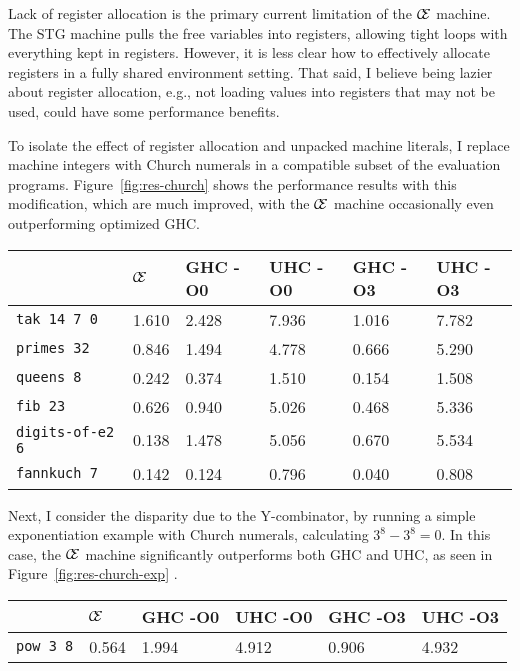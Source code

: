 Lack of register allocation is the primary current limitation of the $\mathcal{\mathcal{C} \mskip -4mu \mathcal{E}}$
machine. The STG machine pulls the free variables into registers, allowing tight
loops with everything kept in registers. However, it is less clear how to
effectively allocate registers in a fully shared environment setting.
That said, I believe being lazier about register allocation, e.g., not loading
values into registers that may not be used, could have some performance benefits.

To isolate the effect of register allocation and unpacked machine
literals, I replace machine integers with Church numerals in a compatible
subset of the evaluation programs. Figure~\ref{fig:res-church}
shows the performance results with this modification, which are much improved,
with the $\mathcal{\mathcal{C} \mskip -4mu \mathcal{E}}$ machine occasionally
even outperforming optimized GHC.

\begin{figure*}
\centering
\begin{tabularx}{\textwidth}{l | X | X | X | X | X}
& $\mathcal{\mathcal{C} \mskip -4mu \mathcal{E}}$ & GHC -O0 & UHC -O0 & GHC -O3 & UHC -O3 \\
\hline
\texttt{tak 14 7 0} & 1.610 & 2.428 & 7.936 & 1.016 & 7.782 \\
\texttt{primes 32} & 0.846 & 1.494 & 4.778 & 0.666 & 5.290 \\
\texttt{queens 8} & 0.242 & 0.374 & 1.510 & 0.154 & 1.508 \\
\texttt{fib 23} & 0.626 & 0.940 & 5.026 & 0.468 & 5.336 \\
\texttt{digits-of-e2 6} & 0.138 & 1.478 & 5.056 & 0.670 & 5.534 \\
\texttt{fannkuch 7} & 0.142 & 0.124 & 0.796 & 0.040 & 0.808 \\
\end{tabularx}
\caption{Church Numeral Benchmark Results. Measurement is wall clock time, 
units are seconds. Times averaged over 5 runs.}
\label{fig:res-church}
\end{figure*}

Next, I consider the disparity due to the Y-combinator, by running a simple
exponentiation example with Church numerals, calculating $3^8 - 3^8 = 0$. In
this case, the $\mathcal{\mathcal{C} \mskip -4mu \mathcal{E}}$ machine
significantly outperforms both GHC and UHC, as seen in
Figure~\ref{fig:res-church-exp} .

\begin{figure*}
\begin{tabularx}{\textwidth}{l | X | X | X | X | X}
& $\mathcal{\mathcal{C} \mskip -4mu \mathcal{E}}$ & GHC -O0 & UHC -O0 & GHC -O3 & UHC -O3 \\
\hline
\texttt{pow 3 8} & 0.564 & 1.994 & 4.912 & 0.906 & 4.932 \\
\end{tabularx}
\caption{Church Numeral Exponentiation Benchmark Results. Measurement is wall clock time, 
units are seconds. Times averaged over 5 runs.}
\label{fig:res-church-exp}
\end{figure*}

